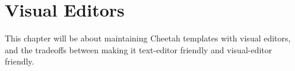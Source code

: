 \section{Visual Editors}
\label{visualEditors}

This chapter will be about maintaining Cheetah templates with visual editors,
and the tradeoffs between making it text-editor friendly and visual-editor
friendly.





